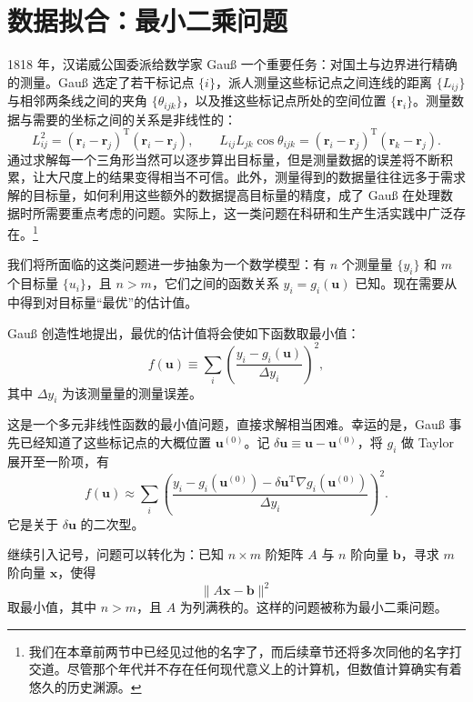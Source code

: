 \section{数据拟合：最小二乘问题}

1818 年，汉诺威公国委派给数学家 Gauß 一个重要任务：对国土与边界进行精确的测量。Gauß 选定了若干标记点 $\{i\}$，派人测量这些标记点之间连线的距离 $\{L_{ij}\}$ 与相邻两条线之间的夹角 $\{\theta_{ijk}\}$，以及推这些标记点所处的空间位置 $\{\bm r_i\}$。测量数据与需要的坐标之间的关系是非线性的：
\begin{equation}
L_{ij}^2=(\bm r_i-\bm r_j)^{\mathrm T}(\bm r_i-\bm r_j),
\qquad
L_{ij}L_{jk}\cos\theta_{ijk}=(\bm r_i-\bm r_j)^{\mathrm T}(\bm r_k-\bm r_j).
\tag{3.3.1}
\end{equation}
通过求解每一个三角形当然可以逐步算出目标量，但是测量数据的误差将不断积累，让大尺度上的结果变得相当不可信。此外，测量得到的数据量往往远多于需求解的目标量，如何利用这些额外的数据提高目标量的精度，成了 Gauß 在处理数据时所需要重点考虑的问题。实际上，这一类问题在科研和生产生活实践中广泛存在。\footnote{我们在本章前两节中已经见过他的名字了，而后续章节还将多次同他的名字打交道。尽管那个年代并不存在任何现代意义上的计算机，但数值计算确实有着悠久的历史渊源。}

我们将所面临的这类问题进一步抽象为一个数学模型：有 $n$ 个测量量 $\{y_i\}$ 和 $m$ 个目标量 $\{u_i\}$，且 $n>m$，它们之间的函数关系 $y_i=g_i(\bm u)$ 已知。现在需要从中得到对目标量“最优”的估计值。

Gauß 创造性地提出，最优的估计值将会使如下函数取最小值：
\begin{equation}
f(\bm u)\equiv\sum_i\left(\frac{y_i-g_i(\bm u)}{\Delta y_i}\right)^2,
\tag{3.3.2}
\end{equation}
其中 $\Delta y_i$ 为该测量量的测量误差。

这是一个多元非线性函数的最小值问题，直接求解相当困难。幸运的是，Gauß 事先已经知道了这些标记点的大概位置 $\bm u^{(0)}$。记 $\delta\bm u\equiv\bm u-\bm u^{(0)}$，将 $g_i$ 做 Taylor 展开至一阶项，有
\begin{equation}
f(\bm u)\approx\sum_i\left(
\frac{y_i-g_i(\bm u^{(0)})-\delta\bm u^{\mathrm T}\nabla g_i(\bm u^{(0)})}{\Delta y_i}
\right)^2.
\tag{3.3.3}
\end{equation}
它是关于 $\delta\bm u$ 的二次型。

继续引入记号，问题可以转化为：已知 $n\times m$ 阶矩阵 $A$ 与 $n$ 阶向量 $\bm b$，寻求 $m$ 阶向量 $\bm x$，使得
\begin{equation}
\lVert A\bm x-\bm b\rVert^2
\tag{3.3.4}
\end{equation}
取最小值，其中 $n>m$，且 $A$ 为列满秩的。这样的问题被称为最小二乘问题。

